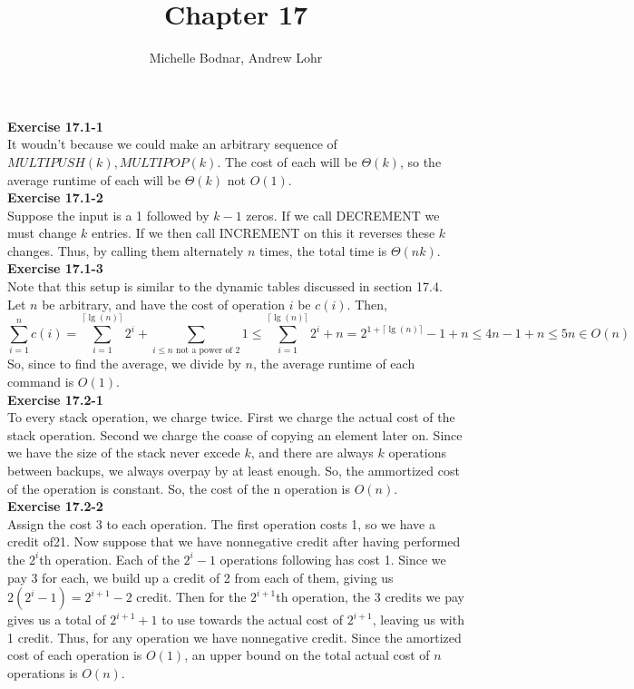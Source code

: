\documentclass{article}
\title{Chapter 17}
\author{Michelle Bodnar, Andrew Lohr}
\begin{document}
\maketitle


\noindent\textbf{Exercise 17.1-1}\\

It woudn't because we could make an arbitrary sequence of $MULTIPUSH(k), MULTIPOP(k)$. The cost of each will be $\Theta(k)$, so the average runtime of each will be $\Theta(k)$ not $O(1)$.\\

\noindent\textbf{Exercise 17.1-2}\\

Suppose the input is a 1 followed by $k-1$ zeros.  If we call DECREMENT we must change $k$ entries.  If we then call INCREMENT on this it reverses these $k$ changes.  Thus, by calling them alternately $n$ times, the total time is $\Theta(nk)$.\\

\noindent\textbf{Exercise 17.1-3}\\

Note that this setup is similar to the dynamic tables discussed in section 17.4. Let $n$ be arbitrary, and have the cost of operation $i$ be $c(i)$. Then,
\[
\sum_{i=1}^n c(i) = \sum_{i=1}^{\lceil\lg(n)\rceil} 2^i + \sum_{i\le n \mbox{ not a power of 2}} 1 \le \sum_{i=1}^{\lceil\lg(n)\rceil} 2^i + n = 2^{1 + \lceil\lg(n)\rceil} -1 + n \le 4n -1 +n \le 5n \in O(n)
\]
So, since to find the average, we divide by $n$, the average runtime of each command is $O(1)$.\\

\noindent\textbf{Exercise 17.2-1}\\

To every stack operation, we charge twice. First we charge the actual cost of the stack operation. Second we charge the coase of copying an element later on. Since we have the size of the stack never excede $k$, and there are always $k$ operations between backups, we always overpay by at least enough. So, the ammortized cost of the operation is constant. So, the cost of the n operation is $O(n)$.\\

\noindent\textbf{Exercise 17.2-2}\\

Assign the cost 3 to each operation. The first operation costs 1, so we have a credit of21.  Now suppose that we have nonnegative credit after having performed the $2^{i}$th operation.  Each of the $2^{i}-1$ operations following has cost 1.  Since we pay 3 for each, we build up a credit of 2 from each of them, giving us $2(2^i-1) = 2^{i+1} - 2$ credit.  Then for the $2^{i+1}$th operation, the 3 credits we pay gives us a total of $2^{i+1} + 1$ to use towards the actual cost of $2^{i+1}$, leaving us with 1 credit.  Thus, for any operation we have nonnegative credit.  Since the amortized cost of each operation is $O(1)$, an upper bound on the total actual cost of $n$ operations is $O(n)$. \\
\end{document}
